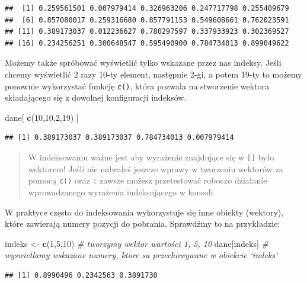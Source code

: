 \documentclass[]{book}
\newenvironment{Shaded}{\begin{snugshade}}{\end{snugshade}}
\newcommand{\KeywordTok}[1]{\textcolor[rgb]{0.13,0.29,0.53}{\textbf{#1}}}
\newcommand{\DecValTok}[1]{\textcolor[rgb]{0.00,0.00,0.81}{#1}}
\newcommand{\StringTok}[1]{\textcolor[rgb]{0.31,0.60,0.02}{#1}}
\newcommand{\CommentTok}[1]{\textcolor[rgb]{0.56,0.35,0.01}{\textit{#1}}}
\newcommand{\NormalTok}[1]{#1}
\theoremstyle{definition}
\theoremstyle{definition}
\theoremstyle{definition}
\theoremstyle{remark}
\begin{document}
\begin{verbatim}
##  [1] 0.259561501 0.007979414 0.326963206 0.247717798 0.255409679
##  [6] 0.857080017 0.259316680 0.857791153 0.549608661 0.762023591
## [11] 0.389173037 0.012236627 0.780297597 0.337933923 0.302369527
## [16] 0.234256251 0.300648547 0.595490900 0.784734013 0.899049622
\end{verbatim}

Możemy także spróbować wyświetlić tylko wskazane przez nas indeksy.
Jeśli chcemy wyświetlić 2 razy 10-ty element, następnie 2-gi, a potem
19-ty to możemy ponownie wykorzystać funkcję \texttt{c()}, która pozwala
na stworzenie wektora składającego się z dowolnej konfiguracji indeksów.

\begin{Shaded}
\begin{Highlighting}[]
\NormalTok{dane[ }\KeywordTok{c}\NormalTok{(}\DecValTok{10}\NormalTok{,}\DecValTok{10}\NormalTok{,}\DecValTok{2}\NormalTok{,}\DecValTok{19}\NormalTok{) ]}
\end{Highlighting}
\end{Shaded}

\begin{verbatim}
## [1] 0.389173037 0.389173037 0.784734013 0.007979414
\end{verbatim}

\begin{quote}
W indeksowaniu ważne jest aby wyrażenie znajdujące się w \texttt{{[}{]}}
było wektorem! Jeśli nie nabrałeś jeszcze wprawy w tworzeniu wektorów za
pomocą \texttt{c()} oraz \texttt{:} zawsze możesz przetestować roboczo
działanie wprowadzanego wyrażenia indeksującego w konsoli
\end{quote}

W praktyce często do indeksowania wykorzystuje się inne obiekty
(wektory), które zawierają numery pozycji do pobrania. Sprawdźmy to na
przykładzie:

\begin{Shaded}
\begin{Highlighting}[]
\NormalTok{indeks <-}\StringTok{ }\KeywordTok{c}\NormalTok{(}\DecValTok{1}\NormalTok{,}\DecValTok{5}\NormalTok{,}\DecValTok{10}\NormalTok{) }\CommentTok{# tworzymy wektor wartości 1, 5, 10}
\NormalTok{dane[indeks] }\CommentTok{# wyswietlamy wskazane numery, ktore sa przechowywane w obiekcie `indeks`}
\end{Highlighting}
\end{Shaded}

\begin{verbatim}
## [1] 0.8990496 0.2342563 0.3891730
\end{verbatim}
\end{document}

